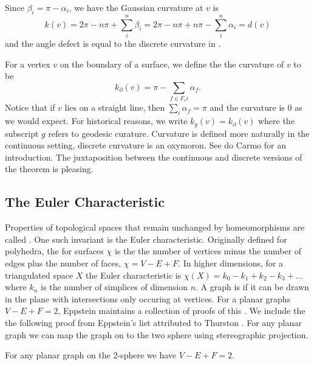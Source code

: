 Since $\beta_i=\pi-\alpha_i$, we have the Gaussian curvature at $v$
is 
$$k(v)=2\pi -n\pi+\sum_{i}^n \beta_i=2\pi-n\pi +n\pi -\sum_i^n\alpha_i=d(v)$$
 and the
 angle defect is equal to the discrete curvature in .


For a vertex $v$ on the boundary of a surface, we define the the curvature
of $v$  to be 
$$k_{\partial}(v)= \pi-\sum_{f\in F_vi}\alpha_f.$$
Notice that if $v$ lies on a straight line, then $\sum_{i}\alpha_f=\pi$
and the curvature is $0$ as we would expect.
For historical reasons,  we write $k_g(v)=k_{\partial}(v)$
where the subscript $g$ refers to geodesic curature.
Curvature is defined more naturally in the continuous setting,
discrete curvature is an oxymoron.  See do Carmo \cite{doc76} for an introduction.
The juxtaposition between the continuous and discrete versions of the theorem
is pleasing.





\subsection{The Euler Characteristic}

Properties of topological spaces that remain unchanged by homeomorphisms are called
. One such invariant is the Euler characteristic.
Originally defined for polyhedra, the  for surfaces $\chi$ is the 
the number of vertices minus the number of edges plus  the number of faces, $\chi=V-E+F.$
In higher dimensions, for a triangulated space $X$ the Euler characteristic is 
$\chi(X)=k_0-k_1+k_2-k_3+\ldots$ where $k_n$ is the number of simplices of dimension $n.$
A  graph  is  if it can be drawn in the plane with intersections only occuring
at vertices.
For a planar graphs $V-E+F=2$, Eppstein maintains a collection of proofs of this \cite{eppstein-proofs}.
We include the the following proof from Eppstein's list attributed to Thurston
 \cite{thurston}. For any planar graph we can map the graph on to the two sphere
 using stereographic projection.
 
\begin{theorem}\label{thm:euler}
For any planar graph on the 2-sphere we have $V-E+F=2.$
\end{theorem}

